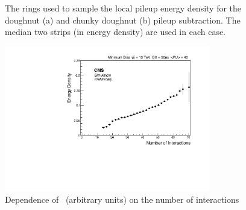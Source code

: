 \begin{figure}
\hfill
{}
\hfill
{}
\hfill
\caption{The rings used to sample the local pileup energy density for the doughnut (a) and chunky doughnut (b)
pileup subtraction. The median two strips (in energy density) are used in each case.}
\end{figure}

\begin{figure}
\centering
    \includegraphics[width=0.8\textwidth]{./Figures/triggerUpgrade/threestrips}
  \caption{Dependence of \rhoC~(arbitrary units) on the number of interactions}
  \label{fig:threestripNint}
\end{figure}  

